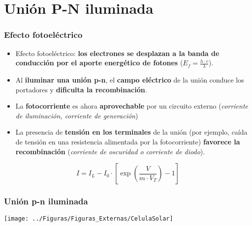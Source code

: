 \documentclass[xcolor=dvipsnames]{beamer}
\begin{document}
\section{Unión P-N iluminada}


\begin{frame}
  \frametitle{Efecto fotoeléctrico}
  \begin{itemize}
  \item Efecto fotoeléctrico: \textbf{los electrones se desplazan a la
      banda de conducción por el aporte energético de fotones}
    ($E_{f}=\frac{h\cdot c}{\lambda}$).
  \item Al \textbf{iluminar una unión p-n}, el \textbf{campo
      eléctrico} de la unión conduce los portadores y
    \textbf{dificulta la recombinación}.
  \item La \textbf{fotocorriente} es ahora \textbf{aprovechable} por
    un circuito externo (\emph{corriente de iluminación, corriente de
      generación})
  \item La presencia de \textbf{tensión en los terminales} de la unión
    (por ejemplo, caída de tensión en una resistencia alimentada por
    la fotocorriente)\textbf{ favorece la recombinación}
    (\emph{corriente de oscuridad o corriente de diodo}).\end{itemize}
  \begin{block} {}

\[
I=I_{L}-I_{0}\cdot[\exp(\frac{V}{m\cdot V_{T}})-1]\]


\end{block}

\end{frame}

\begin{frame}
  \frametitle{Unión p-n iluminada}

  \begin{center}
    \texttt{[image: ../Figuras/Figuras\_Externas/CelulaSolar]}
    \par\end{center}


\end{frame}
\end{document}
